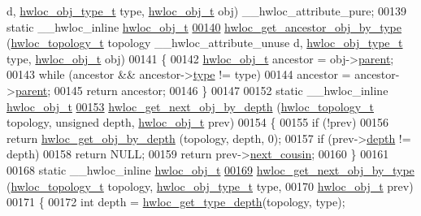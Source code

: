 \begin{DoxyCode}
{{      d, \hyperlink{a00041_gacd37bb612667dc437d66bfb175a8dc55}{hwloc_obj_type_t} type, \hyperlink{a00016}{hwloc_obj_t} obj) \_\_hwloc\_attribute\_pure;
00139 \textcolor{keyword}{static} \_\_hwloc\_inline \hyperlink{a00016}{hwloc_obj_t}
\hypertarget{a00031_source_l00140}{}\hyperlink{a00053_gac93e1a95a71add57ac841daef1b94e5e}{00140} \hyperlink{a00053_gac93e1a95a71add57ac841daef1b94e5e}{hwloc_get_ancestor_obj_by_type} (\hyperlink{a00039_ga9d1e76ee15a7dee158b786c30b6a6e38}{hwloc_topology_t} topology \_\_hwloc\_attribute\_unuse
      d, \hyperlink{a00041_gacd37bb612667dc437d66bfb175a8dc55}{hwloc_obj_type_t} type, \hyperlink{a00016}{hwloc_obj_t} obj)
00141 \{
00142   \hyperlink{a00016}{hwloc_obj_t} ancestor = obj->\hyperlink{a00016_adc494f6aed939992be1c55cca5822900}{parent};
00143   \textcolor{keywordflow}{while} (ancestor && ancestor->\hyperlink{a00016_acc4f0803f244867e68fe0036800be5de}{type} != type)
00144     ancestor = ancestor->\hyperlink{a00016_adc494f6aed939992be1c55cca5822900}{parent};
00145   \textcolor{keywordflow}{return} ancestor;
00146 \}
00147 
00152 \textcolor{keyword}{static} \_\_hwloc\_inline \hyperlink{a00016}{hwloc_obj_t}
\hypertarget{a00031_source_l00153}{}\hyperlink{a00053_gab7c1dce3f42ece5bfa621e87cf332418}{00153} \hyperlink{a00053_gab7c1dce3f42ece5bfa621e87cf332418}{hwloc_get_next_obj_by_depth} (\hyperlink{a00039_ga9d1e76ee15a7dee158b786c30b6a6e38}{hwloc_topology_t} topology, \textcolor{keywordtype}{unsigned} depth, 
      \hyperlink{a00016}{hwloc_obj_t} prev)
00154 \{
00155   \textcolor{keywordflow}{if} (!prev)
00156     \textcolor{keywordflow}{return} \hyperlink{a00047_gaedd78240b0c1108355586a268ec5a697}{hwloc_get_obj_by_depth} (topology, depth, 0);
00157   \textcolor{keywordflow}{if} (prev->\hyperlink{a00016_a9d82690370275d42d652eccdea5d3ee5}{depth} != depth)
00158     \textcolor{keywordflow}{return} NULL;
00159   \textcolor{keywordflow}{return} prev->\hyperlink{a00016_a85a788017457129589318b6c39451acf}{next_cousin};
00160 \}
00161 
00168 \textcolor{keyword}{static} \_\_hwloc\_inline \hyperlink{a00016}{hwloc_obj_t}
\hypertarget{a00031_source_l00169}{}\hyperlink{a00053_ga5f08ceb69375341e73563cfe2e77534e}{00169} \hyperlink{a00053_ga5f08ceb69375341e73563cfe2e77534e}{hwloc_get_next_obj_by_type} (\hyperlink{a00039_ga9d1e76ee15a7dee158b786c30b6a6e38}{hwloc_topology_t} topology, \hyperlink{a00041_gacd37bb612667dc437d66bfb175a8dc55}{hwloc_obj_type_t} type,
00170                    \hyperlink{a00016}{hwloc_obj_t} prev)
00171 \{
00172   \textcolor{keywordtype}{int} depth = \hyperlink{a00046_gaea7c64dd59467f5201ba87712710b14d}{hwloc_get_type_depth}(topology, type);
}}
\end{DoxyCode}
